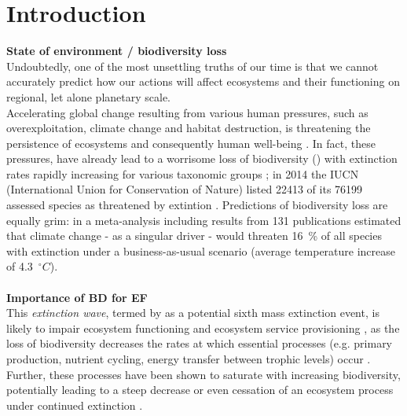 \chapter{Introduction}
\label{chap:intro}
\textbf{State of environment / biodiversity loss}\\
Undoubtedly, one of the most unsettling truths of our time is that we cannot accurately predict how our actions will affect ecosystems and their functioning on regional, let alone planetary scale.\\
Accelerating global change resulting from various human pressures, such as overexploitation, climate change and habitat destruction, is threatening the persistence of ecosystems and consequently human well-being \citep{MEA2005}. In fact, these pressures, have already lead to a worrisome loss of biodiversity ()
with extinction rates rapidly increasing for various taxonomic groups \citep{Dirzo2003,Wake2008}; 
in 2014 the IUCN (International Union for Conservation of Nature) listed 22413 of its 76199 assessed species as threatened by extintion \citep{IUCN2014}. Predictions of biodiversity loss are equally grim: in a meta-analysis including results from 131 publications \cite{Urban2015} estimated that climate change - as a singular driver - would threaten 16~\% of all species with extinction under a business-as-usual scenario (average temperature increase of 4.3~$^{\circ}C$). 
\\\\
%
\textbf{Importance of BD for EF}\\
 This \emph{extinction wave}, termed by \cite{Barnosky2011} as a potential sixth mass extinction event, is likely to impair ecosystem functioning and ecosystem service provisioning \citep{MEA2005}, as
the loss of  biodiversity decreases the rates at which essential processes (e.g. primary production, nutrient cycling, energy transfer between trophic levels) occur \citep[][]{Cardinale2012}. 
Further, these processes have been shown to saturate with increasing biodiversity, potentially leading to a steep decrease or even cessation of an ecosystem process under continued extinction \citep{Cardinale2012,Tilman2014}. 
